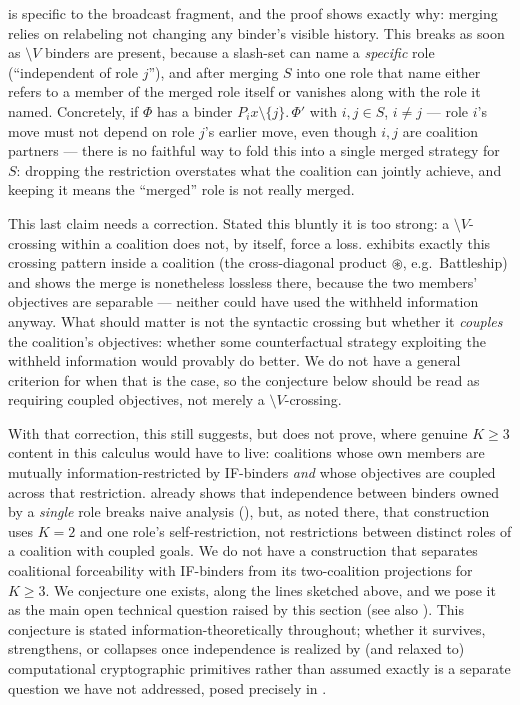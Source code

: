\begin{remark}
 is specific to the broadcast fragment,
and the proof shows exactly why: merging relies on relabeling not changing any
binder's visible history. This breaks as soon as $\setminus V$ binders are
present, because a slash-set can name a \emph{specific} role (``independent
of role $j$''), and after merging $S$ into one role that name either refers to
a member of the merged role itself or vanishes along with the role it named.
Concretely, if $\Phi$ has a binder $P_i x \setminus \{j\}.\,\Phi'$ with
$i,j\in S$, $i \ne j$ --- role $i$'s move must not depend on role $j$'s
earlier move, even though $i,j$ are coalition partners --- there is no
faithful way to fold this into a single merged strategy for $S$: dropping the
restriction overstates what the coalition can jointly achieve, and keeping it
means the ``merged'' role is not really merged.

This last claim needs a correction. Stated this bluntly it is too strong: a
$\setminus V$-crossing within a coalition does not, by itself, force a loss.
 exhibits exactly this crossing pattern
inside a coalition (the cross-diagonal product $\circledast$, e.g.\
Battleship) and shows the merge is nonetheless lossless there, because the two
members' objectives are separable --- neither could have used the withheld
information anyway. What should matter is not the syntactic crossing but
whether it \emph{couples} the coalition's objectives: whether some counterfactual
strategy exploiting the withheld information would provably do better. We do
not have a general criterion for when that is the case, so the conjecture
below should be read as requiring coupled objectives, not merely a $\setminus
V$-crossing.

With that correction, this still suggests, but does not prove, where genuine
$K\ge 3$ content in this calculus would have to live: coalitions whose own
members are mutually information-restricted by IF-binders \emph{and} whose
objectives are coupled across that restriction. \Cref{prop:nexptime-if}
already shows that independence between binders owned by a \emph{single} role
breaks naive analysis (\Cref{rem:nexptime-is-k2}), but, as noted there, that
construction uses $K=2$ and one role's self-restriction, not restrictions
between distinct roles of a coalition with coupled goals. We do not have a
construction that separates coalitional forceability with IF-binders from its
two-coalition projections for $K\ge 3$. We conjecture one exists, along the
lines sketched above, and we pose it as the main open technical question
raised by this section (see also \Cref{sec:conclusion}). This conjecture is
stated information-theoretically throughout; whether it survives, strengthens,
or collapses once independence is realized by (and relaxed to) computational
cryptographic primitives rather than assumed exactly is a separate question we
have not addressed, posed precisely in
.


\end{remark}
